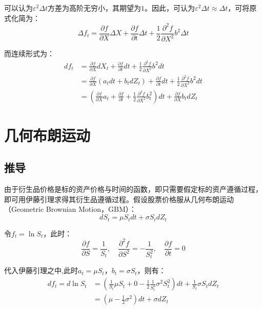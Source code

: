 \documentclass[11pt]{article}
\begin{document}
可以认为$\varepsilon^2 \Delta t$方差为高阶无穷小，其期望为$1$。因此，可认为$\varepsilon^2 \Delta t \approx \Delta t$，可将原式化简为：
\begin{equation*}
    \Delta f_t = \frac{\partial f}{\partial X} \Delta X + \frac{\partial f}{\partial t} \Delta t + \frac{1}{2} \frac{\partial^2 f}{\partial X^2} b^2 \Delta t
\end{equation*}

而连续形式为：
\begin{align*}
    df_t & = \frac{\partial f}{\partial X}  dX_t + \frac{\partial f}{\partial t} dt + \frac{1}{2} \frac{\partial^2 f}{\partial X^2} b^2 dt \\
    & = \frac{\partial f}{\partial X} (a_t dt + b_t dZ_t) + \frac{\partial f}{\partial t} dt + \frac{1}{2} \frac{\partial^2 f}{\partial X^2} b^2 dt \\
    & = \left(\frac{\partial f}{\partial X}a_t  + \frac{\partial f}{\partial t} + \frac{1}{2}\frac{\partial^2 f}{\partial X^2} b^2_t \right)dt + \frac{\partial f}{\partial X} b_t dZ_t
\end{align*}

\section{几何布朗运动}

\subsection{推导}

由于衍生品价格是标的资产价格与时间的函数，即只需要假定标的资产遵循过程，即可用伊藤引理求得其衍生品遵循过程。假设股票价格服从几何布朗运动（Geometric Brownian Motion，GBM）：
\begin{equation*}
    dS_t = \mu S_t dt + \sigma S_t dZ_t
\end{equation*}

令$f_t = \ln S_t$，此时：
\begin{equation*}
    \frac{\partial f}{\partial S} = \frac{1}{S_t}, \quad
    \frac{\partial^2 f}{\partial S^2} = -\frac{1}{S_t^2}, \quad
    \frac{\partial f}{\partial t} = 0
\end{equation*}

代入伊藤引理之中,此时$a_t=\mu S_t$，$b_t=\sigma S_t$，则有：
\begin{align*}
    df_t = d \ln S_t & = \left( \frac{1}{S_t}\mu S_t + 0 - \frac{1}{2} \frac{1}{S_t^2} \sigma^2 S_t^2 \right) dt + \frac{1}{S_t}\sigma S_t dZ_t \\
    & = \left( \mu - \frac{1}{2}\sigma^2\right)dt + \sigma dZ_t
\end{align*}
\end{document}
